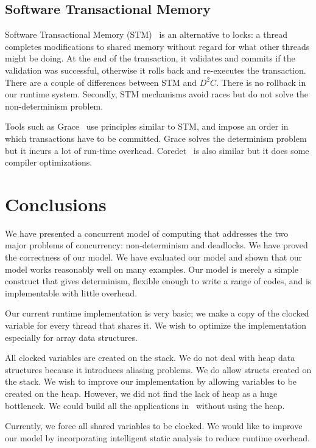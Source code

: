 \documentclass[10pt, conference, compsocconf]{IEEEtran}
\begin{document}
\subsection{Software Transactional Memory} 
Software Transactional Memory (STM)~\cite{shavit1995software} 
  is an alternative to locks: a thread completes modifications to  
shared memory without regard for what other threads might be doing. At the end of the transaction, 
it validates and commits if the validation was successful, otherwise it rolls back and re-executes 
the transaction. There are a couple of differences between STM and $D^2C$.
There is no rollback in our runtime system. Secondly,
 STM mechanisms avoid races but do not solve the non-determinism problem. 
 
Tools such as Grace~\cite{berger2009grace} use principles similar to STM, and impose 
an order in which transactions have to be committed. Grace solves the determinism problem 
but it incurs a lot of run-time overhead. Coredet~\cite{bergan2010coredet} is also similar but it does some compiler optimizations. 




\section{Conclusions}
\label{sec:conclusions}
We have presented a concurrent model of computing that addresses the
two major problems of concurrency: non-determinism and deadlocks.
We have proved the correctness of our model. We have evaluated
our model and shown that our model works reasonably well on many
examples.
Our model is merely a simple construct that gives determinism,
flexible enough to write a range of codes, and is implementable with little overhead.

Our current runtime implementation is very basic; we make a copy
of the clocked variable for every thread that shares it.  
We wish to optimize
the implementation especially for array data structures.

All clocked variables are created on the stack.
We do not deal with heap data structures because
it introduces aliasing problems. We do allow structs
created on the stack.
We wish to improve
our implementation by allowing variables to be created on the heap.
However, we did not find the lack of heap as a huge bottleneck.
We could build all the applications in~ without
using the heap.

Currently, we force all shared variables to be clocked. We would
like to improve our model by incorporating intelligent
static analysis to reduce runtime overhead.
\end{document}
